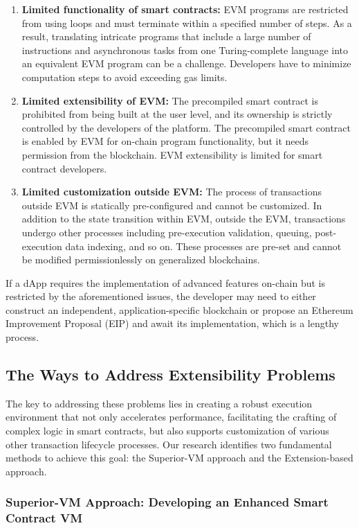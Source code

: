 \begin{enumerate}
    \item \textbf{Limited functionality of smart contracts:} EVM programs are restricted from using loops and must terminate within a specified number of steps. As a result, translating intricate programs that include a large number of instructions and asynchronous tasks from one Turing-complete language into an equivalent EVM program can be a challenge. Developers have to minimize computation steps to avoid exceeding gas limits.
    \item \textbf{Limited extensibility of EVM:} The precompiled smart contract is prohibited from being built at the user level, and its ownership is strictly controlled by the developers of the platform. The precompiled smart contract is enabled by EVM for on-chain program functionality, but it needs permission from the blockchain. EVM extensibility is limited for smart contract developers.
    \item \textbf{Limited customization outside EVM:} The process of transactions outside EVM is statically pre-configured and cannot be customized. In addition to the state transition within EVM, outside the EVM, transactions undergo other processes including pre-execution validation, queuing, post-execution data indexing, and so on. These processes are pre-set and cannot be modified permissionlessly on generalized blockchains.
\end{enumerate}

If a dApp requires the implementation of advanced features on-chain but is restricted by the aforementioned issues, the developer may need to either construct an independent, application-specific blockchain or propose an Ethereum Improvement Proposal (EIP) and await its implementation, which is a lengthy process.

\subsection{The Ways to Address Extensibility Problems}

The key to addressing these problems lies in creating a robust execution environment that not only accelerates performance, facilitating the crafting of complex logic in smart contracts, but also supports customization of various other transaction lifecycle processes. Our research identifies two fundamental methods to achieve this goal: the Superior-VM approach and the Extension-based approach.

\subsubsection{Superior-VM Approach: Developing an Enhanced Smart Contract VM}

